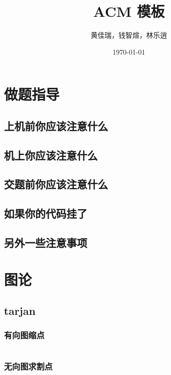 \documentclass[12pt, a4paper, oneside]{ctexart}
\title{ACM 模板}
\author{黄佳瑞，钱智煊，林乐逍}
\date{\today}
\begin{document}
    \scriptsize
    \maketitle
    \newpage
    
    \begin{multicols}{2}
        \tableofcontents
        \newpage

        \section{做题指导}
        \subsection{上机前你应该注意什么}
        
        \subsection{机上你应该注意什么}
        
        \subsection{交题前你应该注意什么}
        
        \subsection{如果你的代码挂了}
        
        \subsection{另外一些注意事项}
        

        \section{图论}
        \subsection{tarjan}
        \subsubsection{有向图缩点}
        \inputminted{cpp}{src/graph/tarjan-directed.cpp}
        \subsubsection{无向图求割点}
        \inputminted{cpp}{src/graph/tarjan-vertex.cpp}

\end{multicols}
\end{document}
